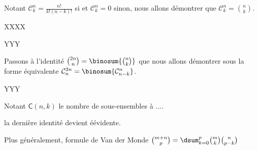 Notant $\mathcal{C}^n_k = \frac{n!}{k!(n-k)!}$ si
et $\mathcal{C}^n_k = 0$ sinon, nous allons démontrer que $\mathcal{C}^n_k = \binom{n}{k}$.

XXXX


%
            {\factobinomintertree}{}


YYY





Passons à l'identité $\binom{2n}{n} = \binosum{\binom{n}{k}}$ que nous allons démontrer sous la forme équivalente  $\mathcal{C}^{2n}_n = \binosum{\mathcal{C}^n_{n-k}}$.

YYY



\begin{remark}
	Notant $\mathsf{C}(n,k)$ le nombre de sous-ensembles à ....
	
	la dernière identité devient éévidente.
\end{remark}


Plus généralement, formule de Van der Monde
$\binom{m+n}{p}=\dsum_{k=0}^p\binom{m}{k}\binom{n}{p-k}$

